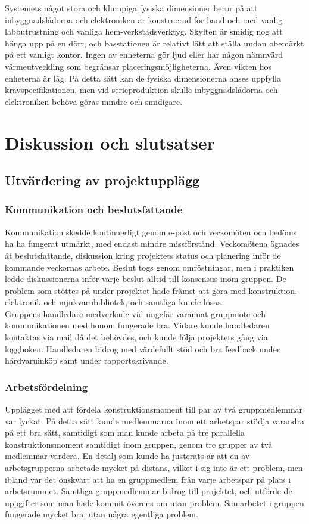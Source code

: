 \documentclass[a4paper,11pt]{article}
\begin{document}
Systemets något stora och klumpiga fysiska dimensioner beror på att inbyggnadslådorna och elektroniken är konstruerad för hand och med vanlig labbutrustning och vanliga hem-verkstadsverktyg. Skylten är smidig nog att hänga upp på en dörr, och basstationen är relativt lätt att ställa undan obemärkt på ett vanligt kontor. Ingen av enheterna gör ljud eller har någon nämnvärd värmeutveckling som begränsar placeringsmöjligheterna. Även vikten hos enheterna är låg. På detta sätt kan de fysiska dimensionerna anses uppfylla kravspecifikationen, men vid serieproduktion skulle inbyggnadslådorna och elektroniken behöva göras mindre och smidigare.

\section{Diskussion och slutsatser}

\subsection{Utvärdering av projektupplägg}

\subsubsection{Kommunikation och beslutsfattande}
Kommunikation skedde kontinuerligt genom e-post och veckomöten och bedöms ha ha fungerat utmärkt, med endast mindre missförstånd. Veckomötena ägnades åt beslutsfattande, diskussion kring projektets status och planering inför de kommande veckornas arbete. Beslut togs genom omröstningar, men i praktiken ledde diskussionerna inför varje beslut alltid till konsensus inom gruppen. De problem som stöttes på under projektet hade främst att göra med konstruktion, elektronik och mjukvarubibliotek, och samtliga kunde lösas.\\

Gruppens handledare medverkade vid ungefär varannat gruppmöte och kommunikationen med honom fungerade bra. Vidare kunde handledaren kontaktas via mail då det behövdes, och kunde följa projektets gång via loggboken. Handledaren bidrog med värdefullt stöd och bra feedback under hårdvaruinköp samt under rapportskrivande.

\subsubsection{Arbetsfördelning}
Upplägget med att fördela konstruktionsmoment till par av två gruppmedlemmar var lyckat. På detta sätt kunde medlemmarna inom ett arbetspar stödja varandra på ett bra sätt, samtidigt som man kunde arbeta på tre parallella konstruktionsmoment samtidigt inom gruppen, genom tre grupper av två medlemmar vardera. En detalj som kunde ha justerats är att en av arbetsgrupperna arbetade mycket på distans, vilket i sig inte är ett problem, men ibland var det önskvärt att ha en gruppmedlem från varje arbetspar på plats i arbetsrummet. Samtliga gruppmedlemmar bidrog till projektet, och utförde de uppgifter som man hade kommit överens om utan problem. Samarbetet i gruppen fungerade mycket bra, utan några egentliga problem.\\
	
\end{document}
